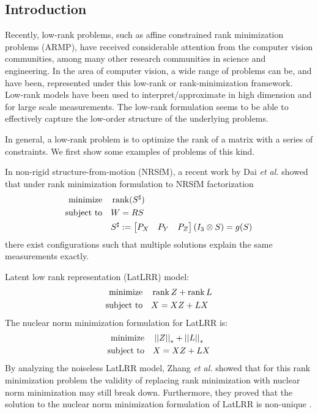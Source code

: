 \documentclass[11pt]{article}
\begin{document}
\subsection{Introduction}

Recently, low-rank problems, such as affine constrained rank minimization problems (ARMP), have received considerable attention from the computer vision communities, among many other research communities in science and engineering. In the area of computer vision, a wide range of problems can be, and have been, represented under this low-rank or rank-minimization framework. Low-rank models have been used to interpret/approximate in high dimension and for large scale measurements. The low-rank formulation seems to be able to effectively capture the low-order structure of the underlying problems.

In general, a low-rank problem is to optimize the rank of a matrix with a series of constraints. We first show some examples of problems of this kind.

\begin{example}
    In non-rigid structure-from-motion (NRSfM), a recent work by Dai \emph{et al.} showed that under rank minimization formulation to NRSfM factorization
    \[\begin{aligned}
        \textnormal{minimize}\quad & \operatorname{rank}(S^{\sharp})\\
        \textnormal{subject to}\quad & W=RS\\
        & S^{\sharp}:=\begin{bmatrix}P_X & P_Y & P_Z\end{bmatrix}\left(I_3\otimes S\right)=g(S)
    \end{aligned}\]
    there exist configurations such that multiple solutions explain the same measurements exactly.
\end{example}

\begin{example}\label{eg:latlrr}
    Latent low rank representation (LatLRR) model:
    \[\begin{aligned}
        \textnormal{minimize}\quad & \operatorname{rank} Z+\operatorname{rank} L\\
        \textnormal{subject to}\quad & X=XZ+LX
    \end{aligned}\]
    The nuclear norm minimization formulation for LatLRR is:
    \[\begin{aligned}
        \textnormal{minimize}\quad & \left|\left|Z\right|\right|_\ast+\left|\left|L\right|\right|_\ast\\
        \textnormal{subject to}\quad & X=XZ+LX
    \end{aligned}\]
    By analyzing the noiseless LatLRR model, Zhang \emph{et al.} showed that for this rank minimization problem the validity of replacing rank minimization with nuclear norm minimization may still break down. Furthermore, they proved that the solution to the nuclear norm minimization formulation of LatLRR is non-unique \cite{dai2014rank}.
\end{example}
\end{document}
